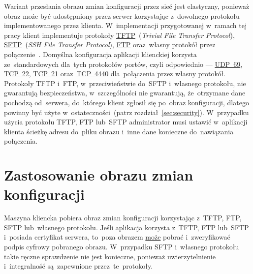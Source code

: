 \documentclass[thesis]{subfiles}
\begin{document}
Wariant przesłania obrazu zmian konfiguracji przez sieć jest elastyczny, ponieważ obraz może być udostępniony przez serwer korzystając z~dowolnego protokołu implementowanego przez klienta. W~implementacji przygotowanej w~ramach tej pracy klient implementuje protokoły \href{https://en.wikipedia.org/wiki/Trivial_File_Transfer_Protocol}{TFTP}~(\emph{Trivial File Transfer Protocol}), \href{https://en.wikipedia.org/wiki/SSH_File_Transfer_Protocol}{SFTP}~(\emph{SSH File Transfer Protocol}), \href{https://en.wikipedia.org/wiki/File_Transfer_Protocol}{FTP} oraz~własny protokół przez połączenie~. Domyślna konfiguracja aplikacji klienckiej korzysta ze~standardowych dla~tych protokołów portów, czyli odpowiednio --- \href{https://www.iana.org/assignments/service-names-port-numbers/service-names-port-numbers.xhtml?search=69}{UDP~69}, \href{https://www.iana.org/assignments/service-names-port-numbers/service-names-port-numbers.xhtml?search=22}{TCP~22}, \href{https://www.iana.org/assignments/service-names-port-numbers/service-names-port-numbers.xhtml?search=21}{TCP~21} oraz~\href{https://www.iana.org/assignments/service-names-port-numbers/service-names-port-numbers.xhtml?search=4440}{TCP~4440} dla~połączenia przez własny protokół. Protokoły TFTP i~FTP, w~przeciwieństwie do~SFTP i~własnego protokołu, nie gwarantują bezpieczeństwa, w~szczególności nie gwarantują, że~otrzymane dane pochodzą od~serwera, do~którego klient zgłosił się po~obraz konfiguracji, dlatego powinny być użyte w~ostateczności~(patrz rozdział~\ref{sec:security}). W~przypadku użycia protokołu TFTP, FTP lub~SFTP administrator musi ustawić w~aplikacji klienta ścieżkę adresu do~pliku obrazu i~inne dane konieczne do~nawiązania połączenia.


\section{Zastosowanie obrazu zmian konfiguracji}
\label{sec:zastosowanie-obrazu-konfiguracji}

Maszyna kliencka pobiera obraz zmian konfiguracji korzystając z~TFTP, FTP, SFTP lub~własnego protokołu. Jeśli aplikacja korzysta z~TFTP, FTP lub~SFTP i~posiada certyfikat serwera, to~poza obrazem \href{https://superuser.com/a/426345/139893}{może} pobrać i~zweryfikować podpis cyfrowy pobranego obrazu. W~przypadku SFTP i~własnego protokołu takie ręczne sprawdzenie nie jest konieczne, ponieważ uwierzytelnienie i~integralność są~zapewnione przez~te~protokoły.
\end{document}
